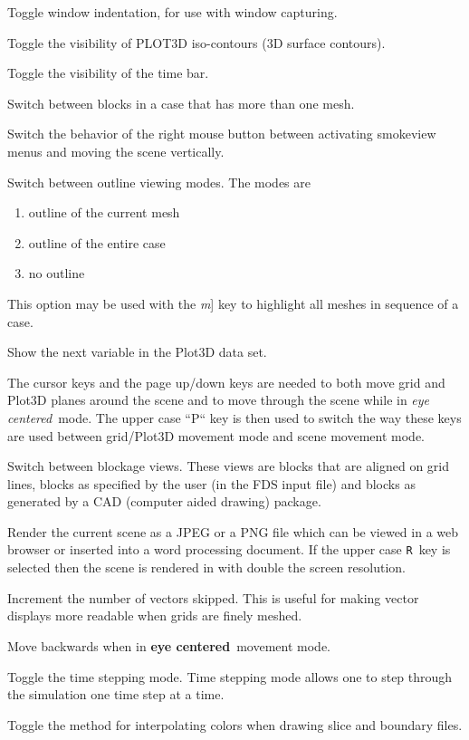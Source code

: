 \documentclass[11pt,twoside]{book}
\newcommand{\hitem}[1]{\item[{\bf #1} \hfill]}
\begin{document}
\hitem{h}Toggle window indentation, for
use with window capturing.

\hitem{i}Toggle the visibility of PLOT3D iso-contours (3D surface
contours).

\hitem{k}Toggle the visibility of the time bar.

\hitem{m}Switch between blocks in a case that has more than one
mesh.

\hitem{M}Switch the behavior of the right mouse button between activating smokeview menus and moving the scene vertically.

\hitem{o}Switch between outline viewing modes. The modes are
\begin{enumerate}
\item outline of the current mesh
\item outline of the entire case
\item no outline
\end{enumerate}
This option may be used with the {\em m}] key to highlight all meshes in sequence of a case.

\hitem{p}Show the next variable in the Plot3D data set.

\hitem{P}The cursor keys and the page up/down keys are needed to
both move grid and Plot3D planes around the scene and to move
through the scene while in {\em eye centered}\ mode.  The upper case
``P`` key is then used to switch the way these keys are used
between grid/Plot3D movement mode and scene movement mode.


\hitem{q}Switch between blockage views.  These views are
blocks that are aligned on grid lines, blocks as specified
by the user (in the FDS input file) and blocks as generated by
a CAD (computer aided drawing) package.

\hitem{r,R}Render the current scene as a JPEG or a PNG file
which can be viewed in a web browser or inserted into a
word processing document.  If the upper case {\tt R}\ key
is selected then the scene is rendered in with double the screen resolution.

\hitem{s}Increment the number of vectors skipped. This is useful
for making vector displays more readable when grids are finely
meshed.

\hitem{s}Move backwards when in {\bf eye centered}\ movement mode.

\hitem{t}Toggle the time stepping mode.  Time stepping mode allows one
to step through the simulation one time step at a time.

\hitem{T}Toggle the method for interpolating colors when drawing slice and boundary files.
\end{document}
